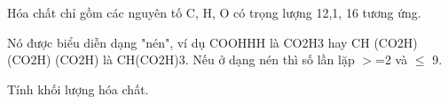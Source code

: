 Hóa chất chỉ gồm các nguyên tố C, H, O có trọng lượng 12,1, 16 tương ứng.  

   Nó được biểu diễn dạng "nén", ví dụ COOHHH là CO2H3  hay CH (CO2H) (CO2H) (CO2H) là CH(CO2H)3. Nếu ở dạng nén thì số lần lặp $>$=2 và  $\le$ 9.  

   Tính khối lượng hóa chất.  



\
